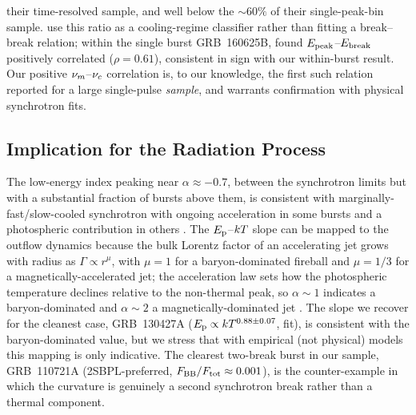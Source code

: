 their time-resolved sample, and well below the $\sim$$60\%$ of their
single-peak-bin sample. \citet{Mei2025} use this ratio as a cooling-regime
classifier rather than fitting a break--break relation; within the single burst GRB~160625B,
\citet{Ravasio2018} found $E_{\rm peak}$--$E_{\rm break}$ positively correlated
($\rho=0.61$), consistent in sign with our within-burst result. Our positive
$\nu_m$--$\nu_c$ correlation is, to our knowledge, the first such relation
reported for a large single-pulse \emph{sample}, and warrants confirmation
with physical synchrotron fits.

\subsection{Implication for the Radiation Process} \label{sec:disc-radiation}
The low-energy index peaking near $\alpha\approx-0.7$, between the
synchrotron limits but with a substantial fraction of bursts above them, is
consistent with marginally-fast/slow-cooled synchrotron with ongoing
acceleration in some bursts and a photospheric contribution in others
\citep[cf.][]{Basak2014,Burgess2014b}. The $E_{\rm p}$--$kT$ slope can be mapped to
the outflow dynamics because the bulk Lorentz factor of an accelerating jet
grows with radius as $\Gamma\propto r^{\mu}$, with $\mu=1$ for a
baryon-dominated fireball and $\mu=1/3$ for a magnetically-accelerated jet;
the acceleration law sets how the photospheric temperature declines relative
to the non-thermal peak, so $\alpha\!\sim\!1$ indicates a baryon-dominated and
$\alpha\!\sim\!2$ a magnetically-dominated jet \citep{Burgess2014a}. The slope
we recover for the cleanest case, GRB~130427A
($E_{\rm p}\propto kT^{0.88\pm0.07}$, \citealt{DAgostini2005} fit), is consistent
with the baryon-dominated value, but we stress that with empirical (not
physical) models this mapping is only indicative. The clearest two-break burst
in our sample, GRB~110721A (2SBPL-preferred, $F_{\rm BB}/F_{\rm
tot}\approx0.001$), is the counter-example in which the curvature is genuinely
a second synchrotron break rather than a thermal component.

